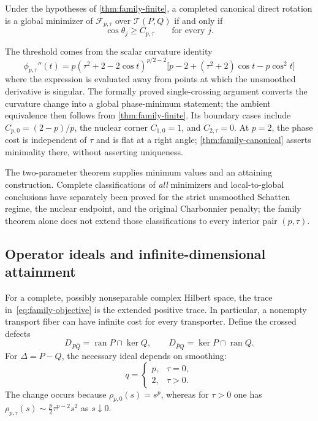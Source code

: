 \begin{theorem}
\label{thm:family-canonical}
Under the hypotheses of \cref{thm:family-finite}, a completed canonical
direct rotation is a global minimizer of $\mathcal F_{p,\tau}$ over
$\mathcal T(P,Q)$ if and only if
\begin{equation}
  \cos\theta_j\ge C_{p,\tau}\qquad\text{for every }j.
  \label{eq:family-canonical-criterion}
\end{equation}
\end{theorem}

The threshold comes from the scalar curvature identity
\[
 \phi_{p,\tau}''(t)
  =p(\tau^2+2-2\cos t)^{p/2-2}
     \bigl[p-2+(\tau^2+2)\cos t-p\cos^2t\bigr]
\]
where the expression is evaluated away from points at which the
unsmoothed derivative is singular.  The formally proved
single-crossing argument converts the curvature change into a global
phase-minimum statement; the ambient equivalence then follows from
\cref{thm:family-finite}.  Its boundary cases include
$C_{p,0}=(2-p)/p$, the nuclear corner $C_{1,0}=1$, and
$C_{2,\tau}=0$.  At $p=2$, the phase cost is independent of $\tau$
and is flat at a right angle; \cref{thm:family-canonical} asserts
minimality there, without asserting uniqueness.

The two-parameter theorem supplies minimum values and an attaining
construction.  Complete classifications of \emph{all} minimizers and
local-to-global conclusions have separately been proved for the strict
unsmoothed Schatten regime, the nuclear endpoint, and the original
Charbonnier penalty; the family theorem alone does not extend those
classifications to every interior pair $(p,\tau)$.

\subsection{Operator ideals and infinite-dimensional attainment}
\label{sec:family-infinite}

For a complete, possibly nonseparable complex Hilbert space, the trace
in~\eqref{eq:family-objective} is the extended positive trace.
In particular, a nonempty transport fiber can have infinite cost for
every transporter.  Define the crossed defects
\[
 D_{P\bar Q}=\operatorname{ran}P\cap\ker Q,
 \qquad D_{\bar P Q}=\ker P\cap\operatorname{ran}Q.
\]
For $\Delta=P-Q$, the necessary ideal depends on smoothing:
\begin{equation}
 q=\begin{cases}
       p,&\tau=0,\\
       2,&\tau>0.
    \end{cases}
 \label{eq:family-ideal-exponent}
\end{equation}
The change occurs because $\rho_{p,0}(s)=s^p$, whereas for
$\tau>0$ one has
$\rho_{p,\tau}(s)\sim \tfrac p2\tau^{p-2}s^2$
as $s\downarrow0$.


